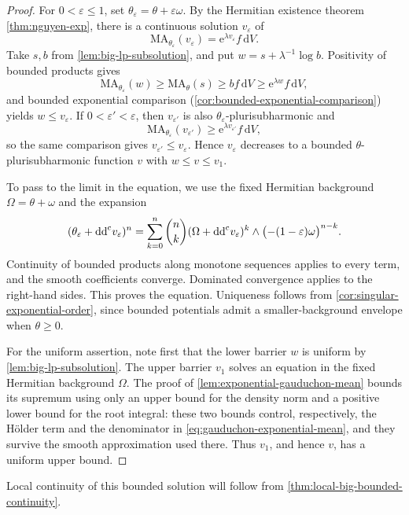 \begin{proof}
For $0<\varepsilon\leq1$, set $\theta_\varepsilon=\theta+\varepsilon\omega$. By the Hermitian existence theorem \cref{thm:nguyen-exp}, there is a continuous solution $v_\varepsilon$ of
\[
 \mathrm{MA}_{\theta_\varepsilon}(v_\varepsilon)
       =\mathrm{e}^{\lambda v_\varepsilon}f\,\mathrm{d}V.
\]
Take $s,b$ from \cref{lem:big-lp-subsolution}, and put $w=s+\lambda^{-1}\log b$. Positivity of bounded products gives
\[
 \mathrm{MA}_{\theta_\varepsilon}(w)
 \geq\mathrm{MA}_\theta(s)\geq bf\,\mathrm{d}V
 \geq \mathrm{e}^{\lambda w}f\,\mathrm{d}V,
\]
and bounded exponential comparison (\cref{cor:bounded-exponential-comparison}) yields $w\leq v_\varepsilon$. If $0<\varepsilon'<\varepsilon$, then $v_{\varepsilon'}$ is also $\theta_\varepsilon$-plurisubharmonic and
\[
 \mathrm{MA}_{\theta_\varepsilon}(v_{\varepsilon'})
 \geq \mathrm{e}^{\lambda v_{\varepsilon'}}f\,\mathrm{d}V,
\]
so the same comparison gives $v_{\varepsilon'}\leq v_\varepsilon$. Hence $v_\varepsilon$ decreases to a bounded $\theta$-plurisubharmonic function $v$ with $w\leq v\leq v_1$.

To pass to the limit in the equation, we use the fixed Hermitian background $\Omega=\theta+\omega$ and the expansion
\[
 (\theta_\varepsilon+\mathrm{dd}^{\mathrm{c}} v_\varepsilon)^n
 =\sum_{k=0}^n\binom nk
       (\Omega+\mathrm{dd}^{\mathrm{c}} v_\varepsilon)^k
       \wedge\bigl(-(1-\varepsilon)\omega\bigr)^{n-k}.
\]
Continuity of bounded products along monotone sequences applies to every term, and the smooth coefficients converge. Dominated convergence applies to the right-hand sides. This proves the equation. Uniqueness follows from \cref{cor:singular-exponential-order}, since bounded potentials admit a smaller-background envelope when $\theta\geq0$.

For the uniform assertion, note first that the lower barrier $w$ is uniform by \cref{lem:big-lp-subsolution}. The upper barrier $v_1$ solves an equation in the fixed Hermitian background $\Omega$. The proof of \cref{lem:exponential-gauduchon-mean} bounds its supremum using only an upper bound for the density norm and a positive lower bound for the root integral: these two bounds control, respectively, the H\"older term and the denominator in \eqref{eq:gauduchon-exponential-mean}, and they survive the smooth approximation used there. Thus $v_1$, and hence $v$, has a uniform upper bound.
\end{proof}

Local continuity of this bounded solution will follow from \cref{thm:local-big-bounded-continuity}.


